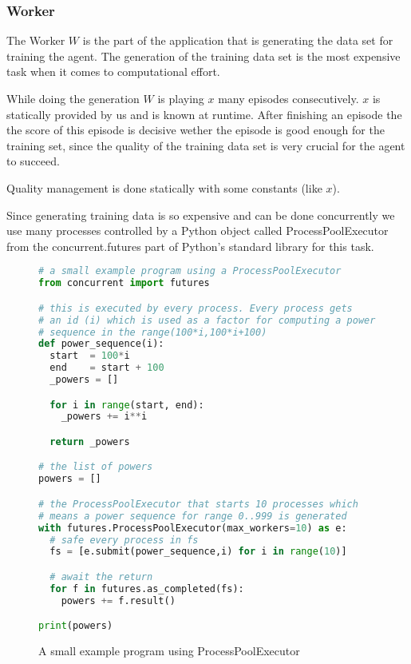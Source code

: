 \subsubsection{Worker}
\label{s_worker}

The Worker $W$ is the part of the application that is
generating the data set for training the agent. The
generation of the training data set is the most expensive
task when it comes to computational effort.

While doing the generation $W$ is playing $x$ many episodes
consecutively. $x$ is statically provided by us and is
known at runtime. After finishing an episode the the score
of this episode is decisive wether the episode is good
enough for the training set, since the quality of the
training data set is very crucial for the agent to succeed.

Quality management is done statically with some constants
(like $x$).

Since generating training data is so expensive and can be
done concurrently we use many processes controlled by a
Python object called ProcessPoolExecutor from the
concurrent.futures part of Python's standard library for
this task.

\begin{figure}[H]
\begin{mdframed}[style=codebox]
\begin{lstlisting}[language=Python]
# a small example program using a ProcessPoolExecutor
from concurrent import futures

# this is executed by every process. Every process gets
# an id (i) which is used as a factor for computing a power
# sequence in the range(100*i,100*i+100)
def power_sequence(i):
  start  = 100*i
  end    = start + 100
  _powers = []

  for i in range(start, end):
    _powers += i**i

  return _powers

# the list of powers
powers = []

# the ProcessPoolExecutor that starts 10 processes which
# means a power sequence for range 0..999 is generated
with futures.ProcessPoolExecutor(max_workers=10) as e:
  # safe every process in fs
  fs = [e.submit(power_sequence,i) for i in range(10)]

  # await the return
  for f in futures.as_completed(fs):
    powers += f.result()

print(powers)
\end{lstlisting}
\end{mdframed}
\caption{A small example program using ProcessPoolExecutor}
\end{figure}

